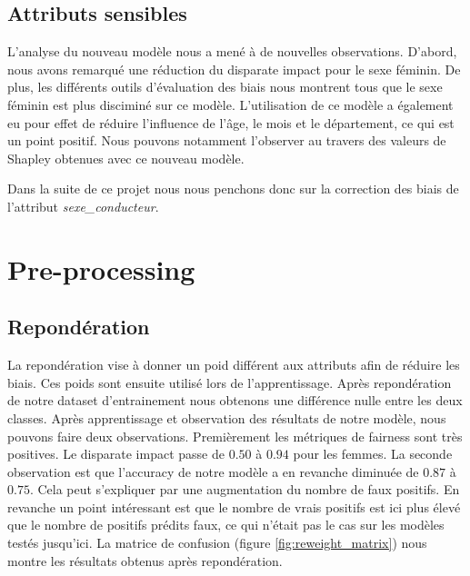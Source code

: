 \documentclass{article}
\begin{document}
    \subsection{Attributs sensibles}
    L'analyse du nouveau modèle nous a mené à de nouvelles observations. D'abord, nous avons 
    remarqué une réduction du disparate impact pour le sexe féminin. De plus, les différents 
    outils d'évaluation des biais nous montrent tous que le sexe féminin est plus disciminé sur 
    ce modèle. L'utilisation de ce modèle a également eu pour effet de réduire l'influence de 
    l'âge, le mois et le département, ce qui est un point positif. Nous pouvons notamment 
    l'observer au travers des valeurs 
    de Shapley obtenues avec ce nouveau modèle. 
    
    Dans la suite de ce projet nous nous penchons 
    donc sur la correction des biais de l'attribut \textit{sexe\_conducteur}.



    \section{Pre-processing}
    \subsection{Repondération}
    La repondération vise à donner un poid différent aux attributs afin de réduire les biais.
    Ces poids sont ensuite utilisé lors de l'apprentissage. Après repondération de notre dataset 
    d'entrainement nous obtenons une différence nulle entre les deux classes.
    Après apprentissage et observation des résultats de notre modèle, nous pouvons faire deux 
    observations. Premièrement les métriques de fairness sont très positives. Le disparate impact 
    passe de $0.50$ à $0.94$ pour les femmes. La seconde observation est que l'accuracy de notre 
    modèle a en revanche diminuée de $0.87$ à $0.75$. Cela peut s'expliquer par une augmentation 
    du nombre de faux positifs. En revanche un point intéressant est que le nombre de 
    vrais positifs est ici plus élevé que le nombre de positifs prédits faux, ce qui n'était pas 
    le cas sur les modèles testés jusqu'ici.
    La matrice de confusion (figure \ref{fig:reweight_matrix}) nous montre 
    les résultats obtenus après repondération.
\end{document}
